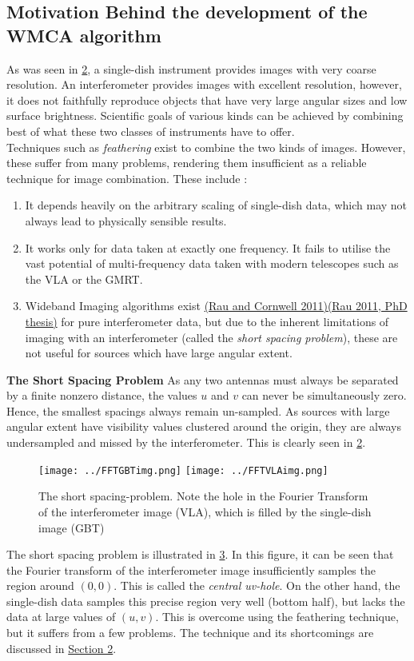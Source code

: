 \documentclass[twocolumn]{aastex61}
\begin{document}
\subsection{Motivation Behind the development of the WMCA algorithm}
As was seen in \hyperref[  2]{\figurename{ 2}}, a single-dish instrument provides images with very coarse resolution. An interferometer provides images with excellent resolution, however, it does not faithfully reproduce objects that have very large angular sizes and low surface brightness. Scientific goals of various kinds can be achieved by combining best of what these two classes of instruments have to offer.\\Techniques such as \textit{feathering} exist to combine the two kinds of images. However, these suffer from many problems, rendering them insufficient as a reliable technique for image combination. These include : 
\begin{enumerate}
\item It depends heavily on the arbitrary scaling of single-dish data, which may not always lead to physically sensible results.
\item It works only for data taken at exactly one frequency. It fails to utilise the vast potential of multi-frequency data taken with modern telescopes such as the VLA or the GMRT. 
\item Wideband Imaging algorithms exist \hyperref[urvpaper]{(Rau and Cornwell 2011)}\hyperref[urvthesis]{(Rau 2011, PhD thesis)} for pure interferometer data, but due to the inherent limitations of imaging with an interferometer (called the \textit{short spacing problem}), these are not useful for sources which have large angular extent. 
\end{enumerate}
\textbf{The Short Spacing Problem}
 As any two antennas must always be separated by a finite nonzero distance, the values $u$ and $v$ can never be simultaneously zero. Hence, the smallest spacings always remain un-sampled.
As sources with large angular extent have visibility values clustered around the origin, they are always undersampled and missed by the interferometer. This is clearly seen in \hyperref[  2]{\figurename{ 2}}.\\

\begin{figure}
\centering
\texttt{[image: ../FFTGBTimg.png]}
\texttt{[image: ../FFTVLAimg.png]}
\caption{The short spacing-problem. Note the hole in the Fourier Transform of the interferometer image (VLA), which is filled by the single-dish image (GBT)}
\label{ 3}
\end{figure}
The short spacing problem is illustrated in \hyperref[ 3]{\figurename{ 3}}.
In this figure, it can be seen that the Fourier transform of the interferometer image insufficiently samples the region around $(0, 0)$. This is called the \textit{central uv-hole}. On the other hand, the single-dish data samples this precise region very well (bottom half), but lacks the data at large values of
$(u,v)$. This is overcome using the feathering technique, but it suffers from a few problems. The technique and its shortcomings are discussed in \hyperref[Sec:Section2]{Section 2}.
\end{document}
